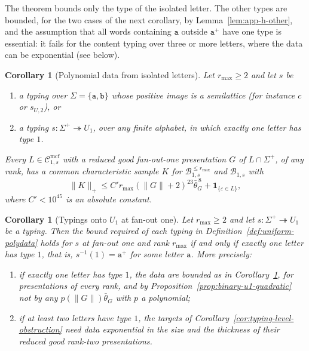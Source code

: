\documentclass[11pt]{article}
\numberwithin{equation}{section}
\theoremstyle{plain}
\newtheorem{corollary}[theorem]{Corollary}
\theoremstyle{definition}
\theoremstyle{remark}
\newcommand{\Cmcf}[2]{\mathcal{C}^{\mathrm{mcf}}_{#1,#2}}
\newcommand{\eps}{\varepsilon}
\theoremstyle{plain}
\begin{document}
The theorem bounds only the type of the isolated letter.  The other types are
bounded, for the two cases of the next corollary, by
Lemma~\ref{lem:app-h-other}, and the assumption that all words containing
$\mathtt a$ outside $\mathtt a^+$ have one type is essential: it fails for the
content typing over three or more letters, where the data can be exponential
(see below).

\begin{corollary}[Polynomial data from isolated letters]
\label{cor:two-letter-fanout-one}
Let $r_{\max}\ge2$ and let $s$ be
\begin{enumerate}[label=\textup{(\roman*)},leftmargin=*]
\item a typing over $\Sigma=\{\mathtt a,\mathtt b\}$ whose positive image is a
semilattice \textup(for instance $c$ or $s_{U,2}$\textup), or
\item a typing $s:\Sigma^+\twoheadrightarrow U_1$, over any finite alphabet,
in which exactly one letter has type $1$.
\end{enumerate}
Every $L\in\Cmcf{1}{s}$ with a reduced good fan-out-one presentation $G$ of
$L\cap\Sigma^+$, of any rank, has a common characteristic sample $K$ for
$\mathcal B^{\le r_{\max}}_{1,s}$ and $\mathcal B_{1,s}$ with
\[
 \|K\|_+\le C'r_{\max}(\|G\|+2)^{23}\bar\theta_G^{\,8}+\mathbf 1_{\{\eps\in L\}},
\]
where $C'<10^{45}$ is an absolute constant.
\end{corollary}

\begin{corollary}[Typings onto $U_1$ at fan-out one]
\label{cor:u1-classification}
Let $r_{\max}\ge2$ and let $s:\Sigma^+\twoheadrightarrow U_1$ be a typing.  Then
the bound required of each typing in Definition~\ref{def:uniform-polydata}
holds for $s$ at fan-out one and rank $r_{\max}$ if and only if exactly one
letter has type $1$, that is, $s^{-1}(1)=\mathtt a^+$ for some letter $\mathtt a$.  More precisely:
\begin{enumerate}[label=\textup{(\roman*)},leftmargin=*]
\item if exactly one letter has type $1$, the data are bounded as in
Corollary~\ref{cor:two-letter-fanout-one}, for presentations of every rank, and
by Proposition~\ref{prop:binary-u1-quadratic} not by any $p(\|G\|)\bar\theta_G$
with $p$ a polynomial;
\item if at least two letters have type $1$, the targets of
Corollary~\ref{cor:typing-level-obstruction} need data exponential in the size
and the thickness of their reduced good rank-two presentations.
\end{enumerate}
\end{corollary}
\end{document}
